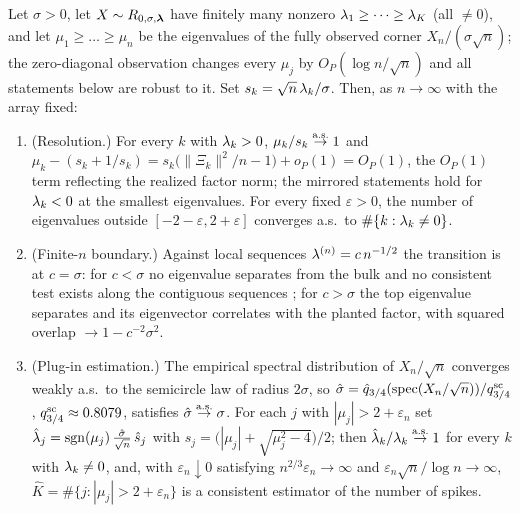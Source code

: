 \begin{proposition}
\label{sprop:bbp}
Let $\sigma>0$, let $X\sim R_{0,\sigma,\bm{\lambda}}$ have finitely many
nonzero $\lambda_1\ge\dots\ge\lambda_K$ (all $\ne0$), and let
$\mu_{1}\ge\dots\ge\mu_n$ be the eigenvalues of the fully observed
corner $X_n/(\sigma\sqrt n)$; the zero-diagonal observation changes
every $\mu_j$ by $O_P(\log n/\sqrt n)$ and all statements below are
robust to it. Set $s_k=\sqrt n\,\lambda_k/\sigma$. Then, as $n\to\infty$
with the array fixed:
\begin{enumerate}[label=(\roman*),itemsep=1pt,topsep=2pt]
\item (Resolution.) For every $k$ with $\lambda_k>0$,
$\mu_k/s_k\overset{\mathrm{a.s.}}{\to}1$ and
$\mu_k-(s_k+1/s_k)=s_k\bigl(\lVert\Xi_k\rVert^2/n-1\bigr)+o_P(1)
=O_P(1)$, the $O_P(1)$ term reflecting the realized factor norm; the
mirrored statements hold for $\lambda_k<0$ at the smallest eigenvalues.
For every fixed $\varepsilon>0$, the number of eigenvalues outside
$[-2-\varepsilon,2+\varepsilon]$ converges a.s.\ to
$\#\{k:\lambda_k\neq0\}$.
\item (Finite-$n$ boundary.) Against local sequences
$\lambda^{(n)}=c\,n^{-1/2}$ the transition is at $c=\sigma$: for
$c<\sigma$ no eigenvalue separates from the bulk and no consistent
test exists along the contiguous sequences
\citep{onatski2013asymptotic,perry2018optimality}; for $c>\sigma$ the
top eigenvalue separates and its eigenvector correlates with the
planted factor, with squared overlap $\to 1-c^{-2}\sigma^2$.
\item (Plug-in estimation.) The empirical spectral distribution of
$X_n/\sqrt n$ converges weakly a.s.\ to the semicircle law of radius
$2\sigma$, so
$\hat\sigma=\hat q_{3/4}(\operatorname{spec}(X_n/\sqrt n))/q_{3/4}^{\rm sc}$,
$q_{3/4}^{\rm sc}\approx0.8079$, satisfies $\hat\sigma\overset{\mathrm{a.s.}}{\to}\sigma$.
For each $j$ with $|\mu_j|>2+\varepsilon_n$ set
$\hat{\lambda}_j=\operatorname{sgn}(\mu_j)\,
\tfrac{\hat\sigma}{\sqrt n}\,\hat s_j$ with
$\hat s_j=\bigl(|\mu_j|+\sqrt{\mu_j^2-4}\bigr)/2$; then
$\hat{\lambda}_k/\lambda_k\overset{\mathrm{a.s.}}{\to}1$ for every $k$ with $\lambda_k\ne0$, and, with
$\varepsilon_n\downarrow0$ satisfying
$n^{2/3}\varepsilon_n\to\infty$ and
$\varepsilon_n\sqrt n/\log n\to\infty$,
$\hat K=\#\{j:|\mu_j|>2+\varepsilon_n\}$ is a consistent estimator of
the number of spikes.
\end{enumerate}
\end{proposition}

